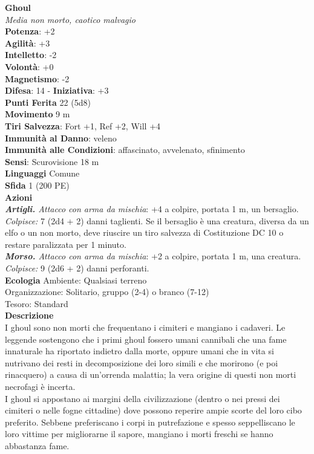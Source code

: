 \begin{multicols}{2}
\medskip\textbf{Ghoul}\\
\emph{Media non morto, caotico malvagio}\\
\textbf{Potenza}: +2\\
\textbf{Agilità}: +3\\
\textbf{Intelletto}: -2\\
\textbf{Volontà}: +0\\
\textbf{Magnetismo}: -2\\
\textbf{Difesa}: 14 - \textbf{Iniziativa}: +3\\
\textbf{Punti Ferita} 22 (5d8)\\
\textbf{Movimento} 9 m\\
\textbf{Tiri Salvezza}: Fort +1, Ref +2, Will +4\\
\textbf{Immunità al Danno}: veleno\\
\textbf{Immunità alle Condizioni}: affascinato, avvelenato, sfinimento\\
\textbf{Sensi}: Scurovisione 18 m\\
\textbf{Linguaggi} Comune\\
\textbf{Sfida} 1 (200 PE)\smallskip\\
\smallskip\textbf{Azioni}\\
\emph{\textbf{Artigli.} Attacco con arma da mischia}: +4 a colpire, portata 1 m, un bersaglio.\\
\emph{Colpisce:} 7 (2d4 + 2) danni taglienti. Se il bersaglio è una creatura, diversa da un elfo o un non morto, deve riuscire un tiro salvezza di Costituzione DC 10 o restare paralizzata per 1 minuto.\\
\emph{\textbf{Morso.} Attacco con arma da mischia}: +2 a colpire, portata 1 m, una creatura.\\
\emph{Colpisce:} 9 (2d6 + 2) danni perforanti.\\
\textbf{Ecologia}
Ambiente: Qualsiasi terreno\\
Organizzazione: Solitario, gruppo (2-4) o branco (7-12)\\
Tesoro: Standard\\
\textbf{Descrizione}\\
I ghoul sono non morti che frequentano i cimiteri e mangiano i cadaveri. Le leggende sostengono che i primi ghoul fossero umani cannibali che una fame innaturale ha riportato indietro dalla morte, oppure umani che in vita si nutrivano dei resti in decomposizione dei loro simili e che morirono (e poi rinacquero) a causa di un’orrenda malattia; la vera origine di questi non morti necrofagi è incerta.\\
I ghoul si appostano ai margini della civilizzazione (dentro o nei pressi dei cimiteri o nelle fogne cittadine) dove possono reperire ampie scorte del loro cibo preferito. Sebbene preferiscano i corpi in putrefazione e spesso seppelliscano le loro vittime per migliorarne il sapore, mangiano i morti freschi se hanno abbastanza fame.\\


\end{multicols}
